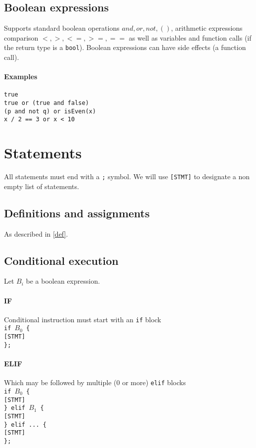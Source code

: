 \documentclass{article}
\begin{document}
\subsection{Boolean expressions}
Supports standard boolean operations $and, or, not, ()$, arithmetic expressions
comparison $<, >, <=, >=, ==$ as well as variables and function calls (if the
return type is a \texttt{bool}). Boolean expressions can have side effects
(a function call).

\paragraph{Examples}
\texttt{true} \\
\texttt{true or (true and false)} \\
\texttt{(p and not q) or isEven(x)} \\
\texttt{x / 2 == 3 or x < 10}

\section{Statements}
All statements must end with a \texttt{;} symbol. We will use \texttt{[STMT]} to
designate a non empty list of statements.

\subsection{Definitions and assignments}
As described in \ref{def}.

\subsection{Conditional execution}
Let $B_i$ be a boolean expression.

\paragraph{IF}
Conditional instruction must start with an \texttt{if} block \\
\texttt{if $B_0$ \{ \\
  \hspace*{2em} [STMT] \\
\};}

\paragraph{ELIF}
Which may be followed by multiple (0 or more) \texttt{elif} blocks \\
\texttt{if $B_0$ \{ \\
  \hspace*{2em} [STMT] \\
\} elif $B_1$ \{ \\
  \hspace*{2em} [STMT] \\
\} elif ... \{ \\
  \hspace*{2em} [STMT] \\
\};}
\end{document}
